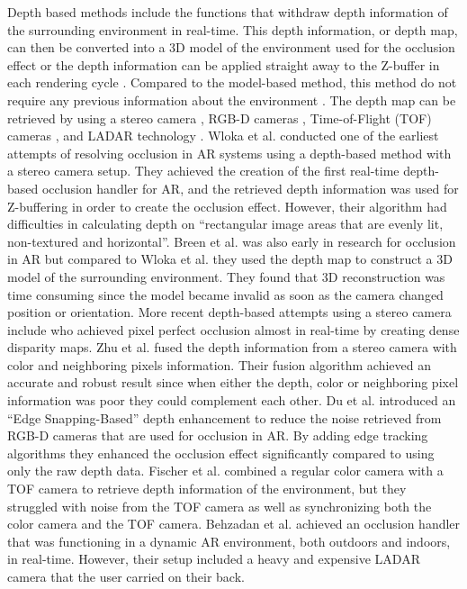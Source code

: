 Depth based methods include the functions that withdraw depth information of the surrounding environment in real-time. This depth information, or depth map, can then be converted into a 3D model of the environment used for the occlusion effect \cite{breen1996interactive} or the depth information can be applied straight away to the Z-buffer in each rendering cycle \cite{wloka1995resolving}. Compared to the model-based method, this method do not require any previous information about the environment \cite{shah2012occlusion}. The depth map can be retrieved by using a stereo camera \cite{breen1996interactive, wloka1995resolving, schmidt2002dense, zhu2010handling}, RGB-D cameras \cite{du2016edge}, Time-of-Flight (TOF) cameras \cite{fischer2007using}, and LADAR technology \cite{behzadan2010scalable}. Wloka et al. \cite{wloka1995resolving} conducted one of the earliest attempts of resolving occlusion in AR systems using a depth-based method with a stereo camera setup. They achieved the creation of the first real-time depth-based occlusion handler for AR, and the retrieved depth information was used for Z-buffering in order to create the occlusion effect. However, their algorithm had difficulties in calculating depth on ``rectangular image areas that are evenly lit, non-textured and horizontal''. Breen et al. \cite{breen1996interactive} was also early in research for occlusion in AR but compared to Wloka et al. \cite{wloka1995resolving} they used the depth map to construct a 3D model of the surrounding environment. They found that 3D reconstruction was time consuming since the model became invalid as soon as the camera changed position or orientation. More recent depth-based attempts using a stereo camera include \cite{schmidt2002dense} who achieved pixel perfect occlusion almost in real-time by creating dense disparity maps. Zhu et al. \cite{zhu2010handling} fused the depth information from a stereo camera with color and neighboring pixels information. Their fusion algorithm achieved an accurate and robust result since when either the depth, color or neighboring pixel information was poor they could complement each other. Du et al. \cite{du2016edge} introduced an ``Edge Snapping-Based'' depth enhancement to reduce the noise retrieved from RGB-D cameras that are used for occlusion in AR. By adding edge tracking algorithms they enhanced the occlusion effect significantly compared to using only the raw depth data. Fischer et al. \cite{fischer2007using} combined a regular color camera with a TOF camera to retrieve depth information of the environment, but they struggled with noise from the TOF camera as well as synchronizing both the color camera and the TOF camera. Behzadan et al. \cite{behzadan2010scalable} achieved an occlusion handler that was functioning in a dynamic AR environment, both outdoors and indoors, in real-time. However, their setup included a heavy and expensive LADAR camera that the user carried on their back.

